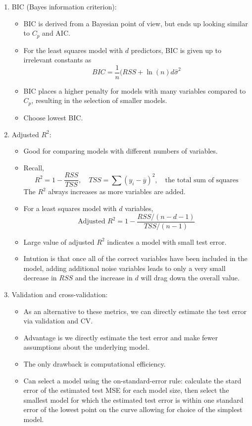 \documentclass{article}
\begin{document}
\begin{enumerate}
\begin{enumerate}
\item BIC (Bayes information criterion):
\begin{itemize}
\item BIC is derived from a Bayesian point of view, but ends up looking similar to $C_p$ and AIC.
\item For the least squares model with $d$ predictors, BIC is given up to irrelevant constants as
\[
BIC = \frac{1}{n} (RSS + \ln(n) d \hat{\sigma}^2
\]
\item BIC places a higher penalty for models with many variables compared to $C_p$, resulting in the selection of smaller models.
\item Choose lowest BIC.
\end{itemize}

\item Adjusted $R^2$:
\begin{itemize}
\item Good for comparing models with different numbers of variables.
\item Recall,
\[
R^2 = 1 - \frac{RSS}{TSS}, \quad TSS = \sum(y_i - \overline{y})^2, \quad \text{the total sum of squares}
\]
The $R^2$ always increases as more variables are added.
\item For a least squares model with $d$ variables,
\[
\text{Adjusted } R^2 = 1-\frac{RSS/(n-d-1)}{TSS/(n-1)}
\]
\item Large value of adjusted $R^2$ indicates a model with small test error.
\item Intution is that once all of the correct variables have been included in the model, adding additional noise variables leads to only a very small decrease in $RSS$ and the increase in $d$ will drag down the overall value.
\end{itemize}

\item Validation and cross-validation: 
\begin{itemize}
\item As an alternative to these metrics, we can directly estimate the test error via validation and CV. 
\item Advantage is we directly estimate the test error and make fewer assumptions about the underlying model. 
\item The only drawback is computational efficiency. 
\item Can select a model using the on-standard-error rule: calculate the stard error of the estimated test MSE for each model size, then select the smallest model for which the estimated test error is within one standard error of the lowest point on the curve allowing for choice of the simplest model.
\end{itemize}
\end{enumerate}

\end{enumerate}
\end{document}
